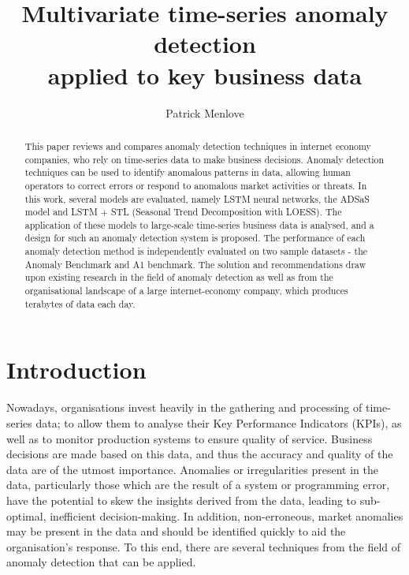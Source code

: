 \documentclass{mpaper}
\begin{document}
\title{Multivariate time-series anomaly detection \\applied to key business data}
\author{Patrick Menlove}

\maketitle

\begin{abstract}

This paper reviews and compares anomaly detection techniques in internet economy companies, who rely on time-series data to make business decisions.
Anomaly detection techniques can be used to identify anomalous patterns in  data, allowing human operators to correct errors or respond to anomalous market activities or threats. 
In this work, several models are evaluated, namely LSTM neural networks, the ADSaS model \citep{ADSaS} and LSTM + STL (Seasonal Trend Decomposition with LOESS). The application of these models to large-scale time-series business data is analysed, and a design for such an anomaly detection system is proposed. 
The performance of each anomaly detection method is independently evaluated on two sample datasets - the \cite{NAB} Anomaly Benchmark and \cite{YahooLabs} A1 benchmark. The solution and recommendations draw upon existing research in the field of anomaly detection as well as from the organisational landscape of a large internet-economy company, which produces terabytes of data each day.

\end{abstract}

\section{Introduction}

Nowadays, organisations invest heavily in the gathering and processing of time-series data; to allow them to analyse their Key Performance Indicators (KPIs), as well as to monitor production systems to ensure quality of service. Business decisions are made based on this data, and thus the accuracy and quality of the data are of the utmost importance. Anomalies or irregularities present in the data, particularly those which are the result of a system or programming error, have the potential to skew the insights derived from the data, leading to sub-optimal, inefficient decision-making. In addition, non-erroneous, market anomalies may be present in the data and should be identified quickly to aid the organisation's response. To this end, there are several techniques from the field of anomaly detection that can be applied.
\end{document}
